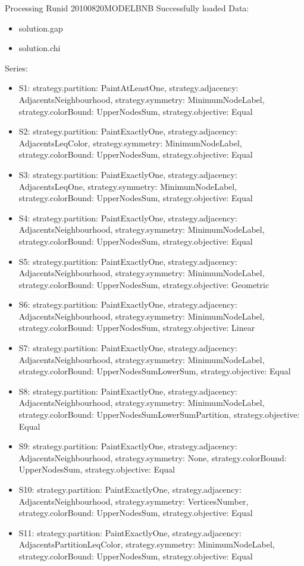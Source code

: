 \documentclass[landscape, 12pt]{report}
\begin{document}
	Processing Runid 20100820MODELBNB
 Successfully loaded
Data:
\begin{itemize}
\item solution.gap
\item solution.chi
\end{itemize}
Series:
\begin{itemize}
\item S1: strategy.partition: PaintAtLeastOne, strategy.adjacency: AdjacentsNeighbourhood, strategy.symmetry: MinimumNodeLabel, strategy.colorBound: UpperNodesSum, strategy.objective: Equal
\item S2: strategy.partition: PaintExactlyOne, strategy.adjacency: AdjacentsLeqColor, strategy.symmetry: MinimumNodeLabel, strategy.colorBound: UpperNodesSum, strategy.objective: Equal
\item S3: strategy.partition: PaintExactlyOne, strategy.adjacency: AdjacentsLeqOne, strategy.symmetry: MinimumNodeLabel, strategy.colorBound: UpperNodesSum, strategy.objective: Equal
\item S4: strategy.partition: PaintExactlyOne, strategy.adjacency: AdjacentsNeighbourhood, strategy.symmetry: MinimumNodeLabel, strategy.colorBound: UpperNodesSum, strategy.objective: Equal
\item S5: strategy.partition: PaintExactlyOne, strategy.adjacency: AdjacentsNeighbourhood, strategy.symmetry: MinimumNodeLabel, strategy.colorBound: UpperNodesSum, strategy.objective: Geometric
\item S6: strategy.partition: PaintExactlyOne, strategy.adjacency: AdjacentsNeighbourhood, strategy.symmetry: MinimumNodeLabel, strategy.colorBound: UpperNodesSum, strategy.objective: Linear
\item S7: strategy.partition: PaintExactlyOne, strategy.adjacency: AdjacentsNeighbourhood, strategy.symmetry: MinimumNodeLabel, strategy.colorBound: UpperNodesSumLowerSum, strategy.objective: Equal
\item S8: strategy.partition: PaintExactlyOne, strategy.adjacency: AdjacentsNeighbourhood, strategy.symmetry: MinimumNodeLabel, strategy.colorBound: UpperNodesSumLowerSumPartition, strategy.objective: Equal
\item S9: strategy.partition: PaintExactlyOne, strategy.adjacency: AdjacentsNeighbourhood, strategy.symmetry: None, strategy.colorBound: UpperNodesSum, strategy.objective: Equal
\item S10: strategy.partition: PaintExactlyOne, strategy.adjacency: AdjacentsNeighbourhood, strategy.symmetry: VerticesNumber, strategy.colorBound: UpperNodesSum, strategy.objective: Equal
\item S11: strategy.partition: PaintExactlyOne, strategy.adjacency: AdjacentsPartitionLeqColor, strategy.symmetry: MinimumNodeLabel, strategy.colorBound: UpperNodesSum, strategy.objective: Equal
\end{itemize}
\end{document}
